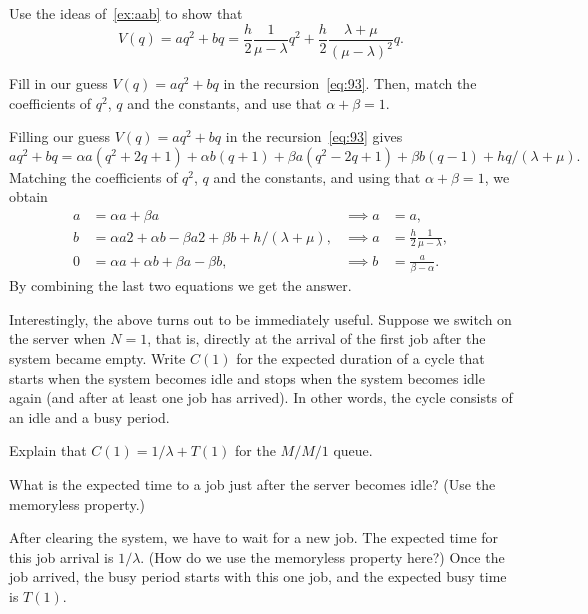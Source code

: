 \documentclass[companion]{subfiles}
\begin{document}
\begin{exercise}
  Use the ideas of~\cref{ex:aab} to show that
  \begin{equation*}
    V(q) = a q^2 + b q = \frac h 2 \frac 1 {\mu -\lambda} q^2 + \frac h 2 \frac{\lambda + \mu}{(\mu - \lambda)^2}q.
  \end{equation*}

\begin{hint}
  Fill in our guess $V(q) = aq^2 + bq$ in the recursion~\cref{eq:93}.
  Then, match the coefficients of $q^2$, $q$ and the constants, and use that $\alpha + \beta = 1$.
\end{hint}

\begin{solution}
 Filling our guess $V(q) = aq^2 + bq$ in the recursion~\cref{eq:93}  gives
  \begin{equation*}
    aq^2 + b q = \alpha a (q^2 + 2q + 1) + \alpha b (q+1) + \beta a (q^2 - 2q + 1) + \beta b (q - 1) + hq/(\lambda + \mu). 
  \end{equation*}
  Matching the coefficients of $q^2$, $q$ and the constants, and using that $\alpha + \beta = 1$, we obtain
  \begin{align*}
    a &= \alpha a + \beta a &\implies a &= a, \\
    b &= \alpha a 2 + \alpha b - \beta a 2 + \beta b + h/(\lambda + \mu), & \implies a &= \frac h 2 \frac 1 {\mu -\lambda},\\
    0 &= \alpha a + \alpha b + \beta a - \beta b, & \implies b &= \frac a {\beta - \alpha}. 
  \end{align*}
By combining the last two equations we get the answer. 
\end{solution}
\end{exercise}


Interestingly, the above turns out to be immediately useful.
Suppose we switch on the server when $N=1$, that is, directly at the arrival of the first job after the system became empty.
Write $C(1)$ for the expected duration of a cycle that starts when the system becomes idle and stops when the system becomes idle again (and after at least one job has arrived).
In other words, the cycle consists of an idle and a busy period.

\begin{exercise}
Explain that $C(1)=1/\lambda + T(1)$ for the $M/M/1$ queue.
\begin{hint}
  What is the expected  time to a job just after the server becomes idle? (Use the memoryless property.)
\end{hint}
\begin{solution}
  After clearing the system, we have to wait for a new job.
  The expected time for this job arrival is $1/\lambda$.
  (How do we use the memoryless property here?)
  Once the job arrived, the busy period starts with this one job, and the expected busy time is $T(1)$.
\end{solution}
\end{exercise}
\end{document}
